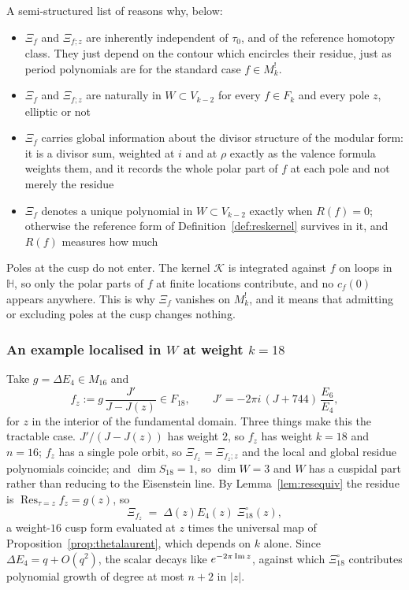 \documentclass[11pt]{article}
\newcommand{\HH}{\mathbb{H}}
\DeclareMathOperator{\Res}{Res}
\begin{document}
A semi-structured list of reasons why, below:
\begin{itemize}
\item $\Xi_f$ and $\Xi_{f;z}$ are inherently independent of $\tau_0$, and of the reference homotopy
class. They just depend on the contour which encircles their residue, just as period polynomials
are for the standard case $f \in M_k^!$.
\item $\Xi_f$ and $\Xi_{f;z}$ are naturally in $W \subset V_{k-2}$ for every $f \in F_k$ and every
pole $z$, elliptic or not
\item $\Xi_f$ carries global information about the divisor structure of the modular form: it is a
divisor sum, weighted at $i$ and at $\rho$ exactly as the valence formula weights them, and it
records the whole polar part of $f$ at each pole and not merely the residue
\item $\Xi_f$ denotes a unique polynomial in $W \subset V_{k-2}$ exactly when $R(f)=0$; otherwise
the reference form of Definition~\ref{def:reskernel} survives in it, and $R(f)$ measures how much
\end{itemize}
Poles at the cusp do not enter. The kernel $\mathcal K$ is integrated against $f$ on loops in $\HH$,
so only the polar parts of $f$ at finite locations contribute, and no $c_f(0)$ appears anywhere.
This is why $\Xi_f$ vanishes on $M^!_k$, and it means that admitting or excluding poles at the cusp
changes nothing.

\subsubsection{An example localised in $W$ at weight $k=18$}\label{sec:resex}

Take $g=\Delta E_4\in M_{16}$ and
\begin{equation}\label{eq:resex}
f_z:=g\,\frac{J'}{J-J(z)}\in F_{18},\qquad J'=-2\pi i\,(J+744)\,\frac{E_6}{E_4},
\end{equation}
for $z$ in the interior of the fundamental domain. Three things make this the tractable case.
$J'/(J-J(z))$ has weight $2$, so $f_z$ has weight $k=18$ and $n=16$; $f_z$ has a single pole orbit,
so $\Xi_{f_z}=\Xi_{f_z;z}$ and the local and global residue polynomials coincide; and
$\dim S_{18}=1$, so $\dim W=3$ and $W$ has a cuspidal part rather than reducing to the Eisenstein
line. By Lemma~\ref{lem:resequiv} the residue is $\Res_{\tau=z}f_z=g(z)$, so
\begin{equation}\label{eq:resexfac}
\Xi_{f_z}\;=\;\Delta(z)E_4(z)\;\Xi^\circ_{18}(z),
\end{equation}
a weight-$16$ cusp form evaluated at $z$ times the universal map of
Proposition~\ref{prop:thetalaurent}, which depends on $k$ alone. Since $\Delta E_4=q+O(q^2)$, the
scalar decays like $e^{-2\pi\,{\rm Im}\,z}$, against which $\Xi^\circ_{18}$ contributes polynomial
growth of degree at most $n+2$ in $|z|$.
\end{document}
